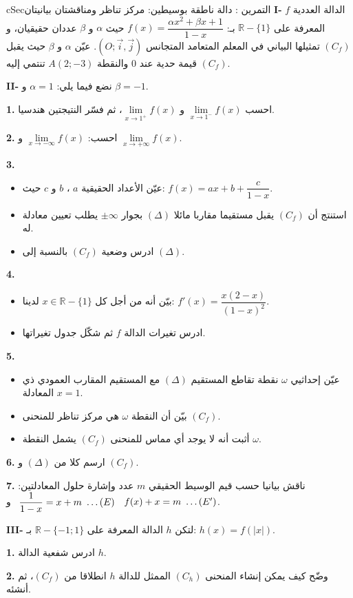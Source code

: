 \documentclass[12pt,a4paper]{article}
\newenvironment{BOX}[2]{\begin{otherlanguage}{english}\begin{arbox}{#1}{#2}}{\end{arbox}\end{otherlanguage}}
\newcounter{exo}
\newenvironment{tamrin}[1]{\stepcounter{exo}\begin{BOX}{cSec}{التمرين \theexo: #1}}{\end{BOX}}
\renewcommand{\ldots}{\mathinner{\ldotp\ldotp\ldotp}}
\newcommand{\R}{\mathbb{R}}
\newenvironment{sq}{\begin{itemize}[leftmargin=2.4em,itemsep=3pt]}{\end{itemize}}
\newcommand{\qa}{\item[(أ)]}\newcommand{\qb}{\item[(ب)]}\newcommand{\qc}{\item[(جـ)]}\newcommand{\qd}{\item[(د)]}\newcommand{\qe}{\item[(هـ)]}
\newcommand{\QQ}[1]{\par\smallskip\textbf{#1.} }
\begin{document}
\begin{tamrin}{دالة ناطقة بوسيطين: مركز تناظر ومناقشتان بيانيتان}
\textbf{I-} $f$ الدالة العددية المعرفة على $\R-\{1\}$ بـ: $f(x)=\dfrac{\alpha x^{2}+\beta x+1}{1-x}$ حيث $\alpha$ و $\beta$ عددان حقيقيان، و $(C_f)$ تمثيلها البياني في المعلم المتعامد المتجانس $\left(O;\vec{i},\vec{j}\right)$.
عيّن $\alpha$ و $\beta$ حيث يقبل $(C_f)$ قيمة حدية عند $0$ والنقطة $A(2;-3)$ تنتمي إليه.

\textbf{II-} نضع فيما يلي: $\alpha=1$ و $\beta=-1$.
\QQ{1} احسب $\lim\limits_{x\to1^{-}}f(x)$ و $\lim\limits_{x\to1^{+}}f(x)$، ثم فسّر النتيجتين هندسيا.
\QQ{2} احسب: $\lim\limits_{x\to-\infty}f(x)$ و $\lim\limits_{x\to+\infty}f(x)$.
\QQ{3}
\begin{sq}
\qa عيّن الأعداد الحقيقية $a$ ، $b$ و $c$ حيث: $f(x)=ax+b+\dfrac{c}{1-x}$.
\qb استنتج أن $(C_f)$ يقبل مستقيما مقاربا مائلا $(\Delta)$ بجوار $\pm\infty$ يطلب تعيين معادلة له.
\qc ادرس وضعية $(C_f)$ بالنسبة إلى $(\Delta)$.
\end{sq}
\QQ{4}
\begin{sq}
\qa بيّن أنه من أجل كل $x\in\R-\{1\}$ لدينا: $f'(x)=\dfrac{x(2-x)}{(1-x)^{2}}$.
\qb ادرس تغيرات الدالة $f$ ثم شكّل جدول تغيراتها.
\end{sq}
\QQ{5}
\begin{sq}
\qa عيّن إحداثيي $\omega$ نقطة تقاطع المستقيم $(\Delta)$ مع المستقيم المقارب العمودي ذي المعادلة $x=1$.
\qb بيّن أن النقطة $\omega$ هي مركز تناظر للمنحنى $(C_f)$.
\qc أثبت أنه لا يوجد أي مماس للمنحنى $(C_f)$ يشمل النقطة $\omega$.
\end{sq}
\QQ{6} ارسم كلا من $(\Delta)$ و $(C_f)$.
\QQ{7} ناقش بيانيا حسب قيم الوسيط الحقيقي $m$ عدد وإشارة حلول المعادلتين: $\dfrac{1}{1-x}=x+m\ \ldots(E)$ \ و \ $f(x)+x=m\ \ldots(E')$.

\textbf{III-} لتكن $h$ الدالة المعرفة على $\R-\{-1;1\}$ بـ: $h(x)=f(|x|)$.
\QQ{1} ادرس شفعية الدالة $h$.
\QQ{2} وضّح كيف يمكن إنشاء المنحنى $(C_h)$ الممثل للدالة $h$ انطلاقا من $(C_f)$، ثم أنشئه.
\end{tamrin}
\end{document}
